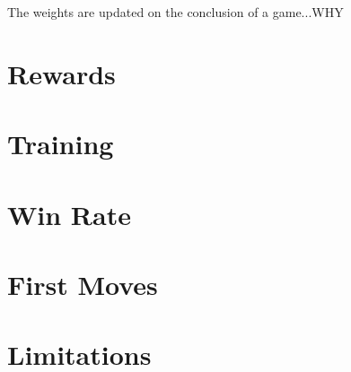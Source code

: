 \documentclass{article}
\begin{document}
   The weights are updated on the conclusion of a game...WHY

   \section{Rewards}
   \section{Training}
   \section{Win Rate}
   \section{First Moves}
   \section{Limitations}
\end{document}
